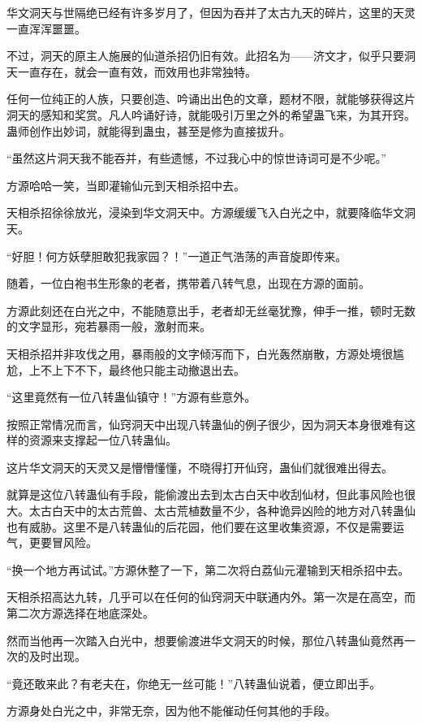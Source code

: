 \begin{this_body}
华文洞天与世隔绝已经有许多岁月了，但因为吞并了太古九天的碎片，这里的天灵一直浑浑噩噩。

不过，洞天的原主人施展的仙道杀招仍旧有效。此招名为——济文才，似乎只要洞天一直存在，就会一直有效，而效用也非常独特。

任何一位纯正的人族，只要创造、吟诵出出色的文章，题材不限，就能够获得这片洞天的感知和奖赏。凡人吟诵好诗，就能吸引万里之外的希望蛊飞来，为其开窍。蛊师创作出妙词，就能得到蛊虫，甚至是修为直接拔升。

“虽然这片洞天我不能吞并，有些遗憾，不过我心中的惊世诗词可是不少呢。”

方源哈哈一笑，当即灌输仙元到天相杀招中去。

天相杀招徐徐放光，浸染到华文洞天中。方源缓缓飞入白光之中，就要降临华文洞天。

“好胆！何方妖孽胆敢犯我家园？！”一道正气浩荡的声音旋即传来。

随着，一位白袍书生形象的老者，携带着八转气息，出现在方源的面前。

方源此刻还在白光之中，不能随意出手，老者却无丝毫犹豫，伸手一推，顿时无数的文字显形，宛若暴雨一般，激射而来。

天相杀招并非攻伐之用，暴雨般的文字倾泻而下，白光轰然崩散，方源处境很尴尬，上不上下不下，最终他只能主动撤退出去。

“这里竟然有一位八转蛊仙镇守！”方源有些意外。

按照正常情况而言，仙窍洞天中出现八转蛊仙的例子很少，因为洞天本身很难有这样的资源来支撑起一位八转蛊仙。

这片华文洞天的天灵又是懵懵懂懂，不晓得打开仙窍，蛊仙们就很难出得去。

就算是这位八转蛊仙有手段，能偷渡出去到太古白天中收刮仙材，但此事风险也很大。太古白天中的太古荒兽、太古荒植数量不少，各种诡异凶险的地方对八转蛊仙也有威胁。这里不是八转蛊仙的后花园，他们要在这里收集资源，不仅是需要运气，更要冒风险。

“换一个地方再试试。”方源休整了一下，第二次将白荔仙元灌输到天相杀招中去。

天相杀招高达九转，几乎可以在任何的仙窍洞天中联通内外。第一次是在高空，而第二次方源选择在地底深处。

然而当他再一次踏入白光中，想要偷渡进华文洞天的时候，那位八转蛊仙竟然再一次的及时出现。

“竟还敢来此？有老夫在，你绝无一丝可能！”八转蛊仙说着，便立即出手。

方源身处白光之中，非常无奈，因为他不能催动任何其他的手段。


\end{this_body}
